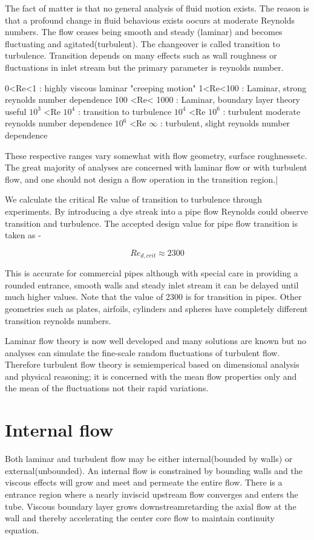 \documentclass{report}
\begin{document}
The fact of matter is that no general analysis of fluid motion exists. The reason is that a profound change in fluid behavious exists
oocurs at moderate Reynolds numbers. The flow ceases being smooth and steady (laminar) and becomes fluctuating and agitated(turbulent).
The changeover is called transition to turbulence. Transition depends on many effects such as wall roughness or fluctuations in inlet stream
but the primary parameter is reynolds number.

0<Re<1 : highly viscous laminar "creeping motion"
1<Re<100 : Laminar, strong reynolds number dependence
100 <Re< 1000 : Laminar, boundary layer theory useful
\(10^3\) <Re \(10^4\) : transition to turbulence
\(10^4\) <Re \(10^6\) : turbulent moderate reynolds number dependence
\(10^6\) <Re \(\infty\) : turbulent, slight reynolds number dependence

These respective ranges vary somewhat with flow geometry, surface roughnessetc. The great majority of analyses are concerned with laminar 
flow or with turbulent flow, and one should not design a flow operation in the transition region.|

We calculate the critical Re value of transition to turbulence through experiments. By introducing a dye streak into a pipe flow Reynolds
could observe transition and turbulence. The accepted design value for pipe flow transition is taken as - 

\[Re_{d,crit} \approx 2300\]

This is accurate for commercial pipes although with special care in providing a rounded entrance, smooth walls and steady inlet stream it can be
delayed until much higher values. Note that the value of 2300 is for transition in pipes. Other geometries such as plates, airfoils, cylinders
and spheres have completely different transition reynolds numbers.

Laminar flow theory is now well developed and many solutions are known but no analyses can simulate the fine-scale random fluctuations of
turbulent flow. Therefore turbulent flow theory is semiemperical based on dimensional analysis and physical reasoning; it is concerned with the 
mean flow properties only and the mean of the fluctuations not their rapid variations.

\section{Internal flow}
Both laminar and turbulent flow may be either internal(bounded by walls) or external(unbounded). An internal flow is constrained by bounding walls
and the viscous effects will grow and meet and permeate the entire flow. There is a entrance region where a nearly inviscid upstream flow
converges and enters the tube. Viscous boundary layer grows downstreamretarding the axial flow at the wall and thereby accelerating the
center core flow to maintain continuity equation.
\end{document}
